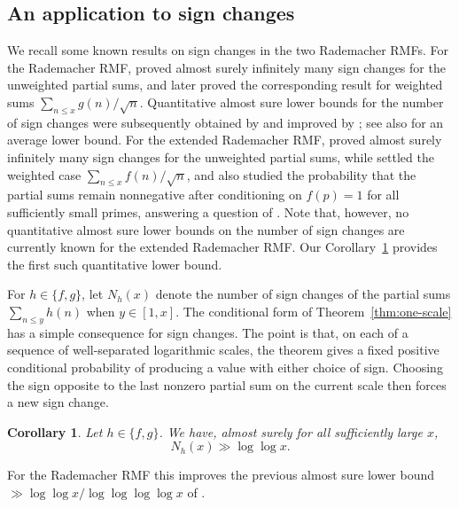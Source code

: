 \documentclass[a4paper,12pt,reqno]{amsart}
\numberwithin{equation}{section}
\newtheorem{corollary}[theorem]{Corollary}
\theoremstyle{remark}
\begin{document}
\subsection{An application to sign changes}

 We  recall some  known results on sign changes in the two Rademacher
RMFs.
For the Rademacher RMF,
\citet{AymoneHeapZhao2023} proved almost surely infinitely many sign changes
for the unweighted partial sums, and \citet{Aymone2024} later proved the
corresponding result for weighted sums
\(\sum_{n\le x} g(n)/\sqrt n\).
Quantitative almost sure lower bounds for the number of sign changes were subsequently
obtained by \citet{GeisHiary2025} and improved by
\citet{KlurmanLamzouriMunsch2024}; see also \citet{Aymone2025Average} for an
average lower bound.
For the extended Rademacher RMF, \citet{Aymone2024} proved almost
surely infinitely many sign changes for the unweighted partial sums, while
\citet{AngeloXu2024} settled the weighted case
\(\sum_{n\le x} f(n)/\sqrt n\), and also studied the probability that the partial sums remain nonnegative after conditioning on \(f(p)=1\) for all sufficiently small primes, answering a question {of \citet{Kucheriaviy2025}}. Note that, however, no quantitative almost sure lower bounds on the number of sign changes are currently known for the extended Rademacher RMF.
 Our Corollary~\ref{cor:sign-changes} provides the first such quantitative lower bound.
 
For $h\in\{f,g\}$, let $N_h(x)$ denote the number of
sign changes of the partial sums $\sum_{n\leq y}h(n)$ when  $y \in [1,x]$. 
The conditional form of Theorem~\ref{thm:one-scale} has a simple
consequence for sign changes. The point is that, on each of a sequence
of well-separated logarithmic scales, the theorem gives a fixed positive
conditional probability of producing a value with either choice of
sign. Choosing the sign opposite to the last nonzero partial sum on the
current scale then forces a new sign change.

\begin{corollary}\label{cor:sign-changes} Let $h\in\{f,g\}$. We have, almost surely for all sufficiently large $x$,
\[
 N_h(x)\gg\log\log x.
\]
\end{corollary}

For the Rademacher RMF this improves the previous almost sure lower
bound $\gg \log\log x/\log\log\log\log x$ of
\citet[Corollary~1.7]{KlurmanLamzouriMunsch2024}. %
\end{document}
